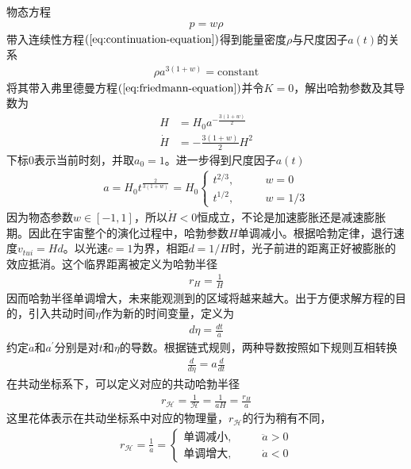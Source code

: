 \documentclass{article}
\begin{document}
  物态方程
  \begin{align}
    \label{eq:state-equation}
    p=w\rho  
  \end{align}
  带入连续性方程$(\ref{eq:continuation-equation})$得到能量密度$\rho$与尺度因子$a(t)$的关系
  \begin{align}
    \rho a^{3{\left(1+w\right)}}=\text{constant}
  \end{align}
  将其带入弗里德曼方程$(\ref{eq:friedmann-equation})$并令$K=0$，解出哈勃参数及其导数为
  \begin{align}
    \label{eq:hubble-parameter}
    H &=H_0 a^{-\frac{3(1+w)}{2}}\\
    \label{eq:1st-hubble-parameter}
    \dot{H} &= -\frac{3(1+w)}{2}H^2
  \end{align}
  下标$0$表示当前时刻，并取$a_0=1$。进一步得到尺度因子$a(t)$
  \begin{align}
    \label{eq:scale-factor}
    a = H_0 t^{\frac{2}{3(1+w)}} = H_0
    \begin{cases}
      t^{2 /3},\qquad & w=0 \\
      t^{1 /2},\qquad & w=1 /3
    \end{cases}
  \end{align}
  因为物态参数$w\in [-1,
  1]$，所以$\dot{H}<0$恒成立，不论是加速膨胀还是减速膨胀期。因此在宇宙整个的演化过程中，哈勃参数$H$单调减小。根据哈勃定律，退行速度$v_{tui}=Hd$。以光速$c=1$为界，相距$d=1
  /H$时，光子前进的距离正好被膨胀的效应抵消。这个临界距离被定义为哈勃半径
  \begin{align}
    \label{eq:hubble-distance}
    r_{H}=\frac{1}{H}
  \end{align}
  因而哈勃半径单调增大，未来能观测到的区域将越来越大。出于方便求解方程的目的，引入共动时间$\eta$作为新的时间变量，定义为
  \begin{align}
    \label{eq:conformal-time}
    d\eta = \frac{dt}{a}
  \end{align}
  约定$\dot{a}$和$a^\prime$分别是对$t$和$\eta$的导数。根据链式规则，两种导数按照如下规则互相转换
  \begin{align}
    \label{eq:t-to-eta}
    \frac{d}{d\eta}=a \frac{d}{dt}
  \end{align}
  在共动坐标系下，可以定义对应的共动哈勃半径
  \begin{align}
    \label{eq:comoving-hubble-distance}
    r_{\mathcal{H}} = \frac{1}{\mathcal{H}} = \frac{1}{aH} = \frac{r_{H}}{a}
  \end{align}
  这里花体表示在共动坐标系中对应的物理量，$r_{\mathcal{H}}$的行为稍有不同，
  \begin{align}
    r_{\mathcal{H}} = \frac{1}{\dot{a}} =
    \begin{cases}
      \text{单调减小},\qquad & \ddot{a}>0 \\
      \text{单调增大},\qquad &\dot{a} < 0
    \end{cases}
  \end{align}
\end{document}

